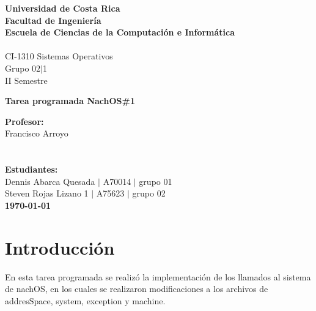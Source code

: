 \documentclass[12pt]{article}
\begin{document}
\sffamily


\begin{center}
	\LARGE\textbf{Universidad de Costa Rica}\\
	\textbf{Facultad de Ingeniería}\\
	\textbf{Escuela de Ciencias de la Computación e Informática}\\ \ \\
	\Large 	CI-1310 Sistemas Operativos\\
	Grupo $02|$1\\
	II Semestre
\end{center}


\begin{center}
	\huge\textbf{Tarea programada NachOS\#1}
\end{center}

\begin{center}
	\LARGE\textbf{Profesor:}\\
	Francisco Arroyo\\ \ \\ \ \\
	\LARGE\textbf{Estudiantes:}\\
	Dennis Abarca Quesada $|$ A70014 $|$ grupo 01\\	
	Steven Rojas Lizano 1 $|$ A75623 $|$ grupo 02\\
	
	\textbf{ \today}
\end{center}
\thispagestyle{empty}
\newpage

\tableofcontents

\thispagestyle{empty}
\newpage\setcounter{page}{1}

\newpage
\section[introducción]{Introducción}
En esta tarea programada se realizó la implementación de los llamados al sistema de nachOS, en los cuales se realizaron modificaciones a los archivos de addresSpace, system, exception y machine.\\
\end{document}

